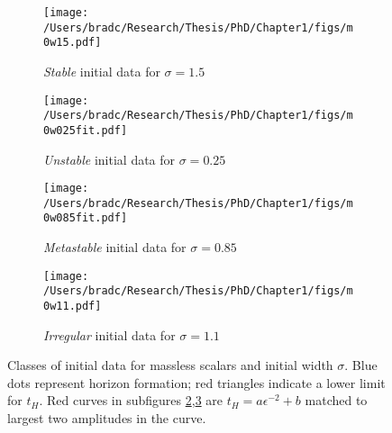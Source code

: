 \documentclass[../PhD.tex]{subfiles}
\begin{document}
\begin{figure}[!t]
\centering
\begin{subfigure}[t]{0.47\textwidth}
\texttt{[image: /Users/bradc/Research/Thesis/PhD/Chapter1/figs/m0w15.pdf]}
\caption{\textit{Stable} initial data for $\sigma=1.5$}
\label{f:m0w15}
\end{subfigure}\hfill
\begin{subfigure}[t]{0.47\textwidth}
\texttt{[image: /Users/bradc/Research/Thesis/PhD/Chapter1/figs/m0w025fit.pdf]}
\caption{\textit{Unstable} initial data for $\sigma=0.25$}
\label{f:m0w025}
\end{subfigure}
\begin{subfigure}[t]{0.47\textwidth}
\texttt{[image: /Users/bradc/Research/Thesis/PhD/Chapter1/figs/m0w085fit.pdf]}
\caption{\textit{Metastable} initial data for $\sigma=0.85$}
\label{f:m0w085}
\end{subfigure}\hfill
\begin{subfigure}[t]{0.47\textwidth}
\texttt{[image: /Users/bradc/Research/Thesis/PhD/Chapter1/figs/m0w11.pdf]}
\caption{\textit{Irregular} initial data for $\sigma=1.1$}
\label{f:m0w11}
\end{subfigure}
\caption[Horizon formation time vs. amplitude for classes of initial data]{Classes of initial data for massless scalars and initial width
$\sigma$.  Blue dots represent horizon formation;
red triangles indicate a lower limit for $t_H$.  Red curves in subfigures
\ref{f:m0w025},\ref{f:m0w085} are $t_H=a\epsilon^{-2}+b$ matched to largest
two amplitudes in the curve.}
\label{f:classes}
\end{figure}
\end{document}
